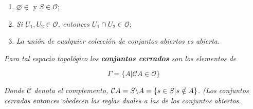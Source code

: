 \documentclass[a4paper,10pt]{article}
\numberwithin{equation}{section}
\begin{document}
\begin{enumerate}[label=(T{\arabic*})]
 \item $\varnothing \in \mathcal{}$ y $S \in \mathcal{O}$;
 \item \emph{Si $U_1,U_2 \in \mathcal{O}$, entonces $U_1 \cap U_2 \in \mathcal{O}$};
 \item \emph{La unión de cualquier colección de conjuntos abiertos es abierta.}
\end{enumerate}

\emph{Para tal espacio topológico los \textbf{conjuntos cerrados} son 
los elementos de}

$$
\Gamma = \{A | \mathcal{C} A \in \mathcal{O} \}
$$

\emph{Donde $\mathcal{C}$ denota el complemento, $\mathcal{C}A = S {\char`\\} A = \{s \in S | s \notin A\}$.
(Los conjuntos cerrados entonces obedecen las reglas duales a las de los conjuntos abiertos.}

\vspace{.3cm}
\end{document}
